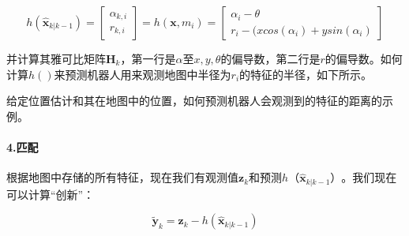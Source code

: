 \begin{equation} h(\hat{\boldsymbol{x}}_{k|k-1})=\left[\begin{array}{c}\alpha_{k,i}\\r_{k,i}\end{array}\right]=h(\boldsymbol{x},m_i)=\left[\begin{array}{c}\alpha_i-\theta\\r_i-(x cos(\alpha_i)+y sin(\alpha_i)\end{array}\right]
\end{equation}


并计算其雅可比矩阵$\boldsymbol{H}_{k}$，第一行是$\alpha$至$x,y,\theta$的偏导数，第二行是$r$的偏导数。如何计算$h()$来预测机器人用来观测地图中半径为$r_i$的特征的半径，如下所示。

\begin{framed}

给定位置估计和其在地图中的位置，如何预测机器人会观测到的特征的距离的示例。
\end{framed}


\paragraph{4.匹配}
根据地图中存储的所有特征，现在我们有观测值$\boldsymbol{z}_k$和预测$h（\hat{\boldsymbol{x}}_{k|k-1}）$。我们现在可以计算“创新”：

\begin{equation}
\tilde{\boldsymbol{y}}_{k}=\boldsymbol{z}_{k}-h(\hat{\boldsymbol{x}}_{k|k-1})
\end{equation}


